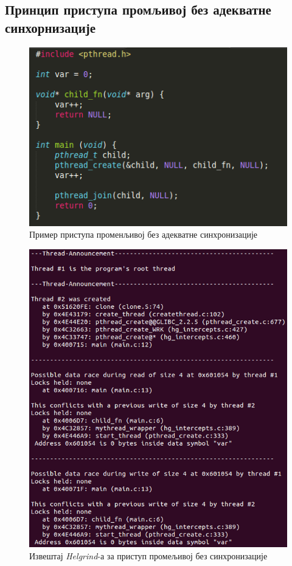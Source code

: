 \documentclass[12pt,oneside]{memoir}
\begin{document}
\subsection{Принцип приступа промљивој без адекватне синхорнизације}

\begin{figure}[h!]
\begin{center}
\includegraphics[scale=0.75]{slika14.png}
\end{center}
\caption{Пример приступа променљивој без адекватне синхронизације}
\label{fig:main4}
\end{figure}

\begin{figure}[h!]
\begin{center}
\includegraphics[scale=0.75]{slika15.png}
\end{center}
\caption{Извештај \textit{Helgrind}-а за приступ промељивој без синхронизације }
\label{fig:izvestaj}
\end{figure}
\end{document}
